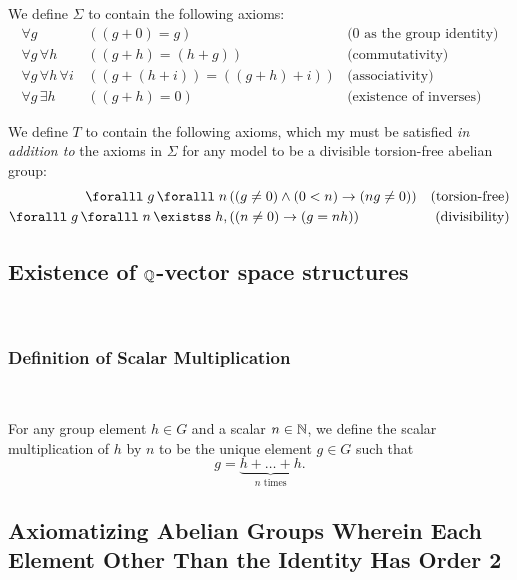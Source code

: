 We define $\Sigma$ to contain the following axioms:
\begin{align}
  \forall g &( (g + 0) = g) &\text{($0$ as the group identity)}\\
  \forall g\, \forall h\, &( (g + h) = (h + g) ) &\text{(commutativity)} \\
  \forall g\, \forall h\, \forall i\, &( (g + (h + i)) = ((g + h) + i) ) &\text{(associativity)} \\
  \forall g\, \exists h\, &( (g + h) = 0) &\text{(existence of inverses)}
\end{align}

We define $T$ to contain the following axioms, which my must be satisfied \emph{in addition to}
the axioms in $\Sigma$ for any model to be a divisible torsion-free abelian group:
\begin{align}
  \forall g\, \forall n\, &( (g \neq 0) \land (0 < n) \lto (ng \neq 0)) &\text{(torsion-free)} \\
  \forall g\, \forall n\, \exists h,\, &((n \neq 0) \lto (g = nh)) &\text{(divisibility)}
\end{align}

\bigskip

\subsection{Existence of \texorpdfstring{$\mathbb{Q}$}{Q}-vector space structures}~\label{sec:q-vector-space}


\subsubsection{Definition of Scalar Multiplication}~\label{subsec:scalar-multiplication}

For any group element $h \in G$ and a scalar $n \in \mathbb{N}$, we define
the scalar multiplication of $h$ by $n$ to be the unique element $g \in G$
such that \[ g = \underbrace{h + \ldots + h}_{\text{$n$ times}}. \]


\bigskip

\subsection{Axiomatizing Abelian Groups Wherein Each Element Other Than the Identity
Has Order 2}~\label{sec:axiomatizing-abelian-groups-order-two}


